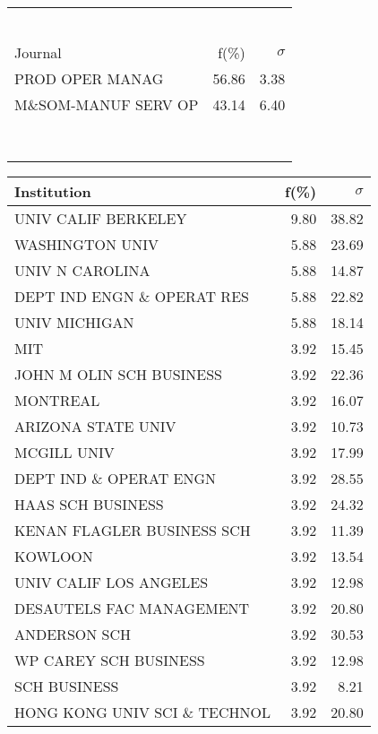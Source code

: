 \documentclass[a4paper,11pt]{report}
\begin{document}
\begin{landscape}
\begin{table}[!ht]
{\begin{tabular}{|l r  r|}
 &  & \\
 &  & \\
 &  & \\
 &  & \\
 &  & \\
 &  & \\
\hline
\hline
Journal & f(\%) & $\sigma$\\
\hline
PROD OPER MANAG & 56.86 & 3.38\\
M\&SOM-MANUF SERV OP & 43.14 & 6.40\\
 &  & \\
 &  & \\
 &  & \\
 &  & \\
 &  & \\
 &  & \\
 &  & \\
 &  & \\
\hline
\end{tabular}
}
{\scriptsize\begin{tabular}{|l r r|}
\hline
Institution & f(\%) & $\sigma$\\
\hline
UNIV CALIF BERKELEY & 9.80 & 38.82\\
WASHINGTON UNIV & 5.88 & 23.69\\
UNIV N CAROLINA & 5.88 & 14.87\\
DEPT IND ENGN \& OPERAT RES & 5.88 & 22.82\\
UNIV MICHIGAN & 5.88 & 18.14\\
MIT & 3.92 & 15.45\\
JOHN M OLIN SCH BUSINESS & 3.92 & 22.36\\
MONTREAL & 3.92 & 16.07\\
ARIZONA STATE UNIV & 3.92 & 10.73\\
MCGILL UNIV & 3.92 & 17.99\\
DEPT IND \& OPERAT ENGN & 3.92 & 28.55\\
HAAS SCH BUSINESS & 3.92 & 24.32\\
KENAN FLAGLER BUSINESS SCH & 3.92 & 11.39\\
KOWLOON & 3.92 & 13.54\\
UNIV CALIF LOS ANGELES & 3.92 & 12.98\\
DESAUTELS FAC MANAGEMENT & 3.92 & 20.80\\
ANDERSON SCH & 3.92 & 30.53\\
WP CAREY SCH BUSINESS & 3.92 & 12.98\\
SCH BUSINESS & 3.92 & 8.21\\
HONG KONG UNIV SCI \& TECHNOL & 3.92 & 20.80\\

\end{tabular}}
\end{table}
\end{landscape}
\end{document}
